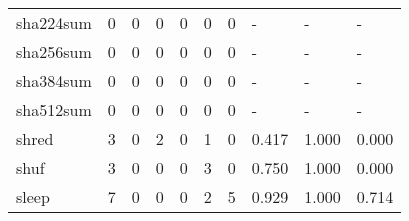 \begin{longtable}{lp{1.3cm}p{1.3cm}p{1.3cm}p{1.3cm}p{1.3cm}p{1.3cm}p{1.3cm}p{1.3cm}p{1.3cm}}
sha224sum &                      0 &                                             0 &                                            0 &                                           0 &                                            0 &                                          0 &                                    - &                                      - &                                    - \\
sha256sum &                      0 &                                             0 &                                            0 &                                           0 &                                            0 &                                          0 &                                    - &                                      - &                                    - \\
sha384sum &                      0 &                                             0 &                                            0 &                                           0 &                                            0 &                                          0 &                                    - &                                      - &                                    - \\
sha512sum &                      0 &                                             0 &                                            0 &                                           0 &                                            0 &                                          0 &                                    - &                                      - &                                    - \\
shred     &                      3 &                                             0 &                                            2 &                                           0 &                                            1 &                                          0 &                                0.417 &                                  1.000 &                                0.000 \\
shuf      &                      3 &                                             0 &                                            0 &                                           0 &                                            3 &                                          0 &                                0.750 &                                  1.000 &                                0.000 \\
sleep     &                      7 &                                             0 &                                            0 &                                           0 &                                            2 &                                          5 &                                0.929 &                                  1.000 &                                0.714 \\

\end{longtable}
